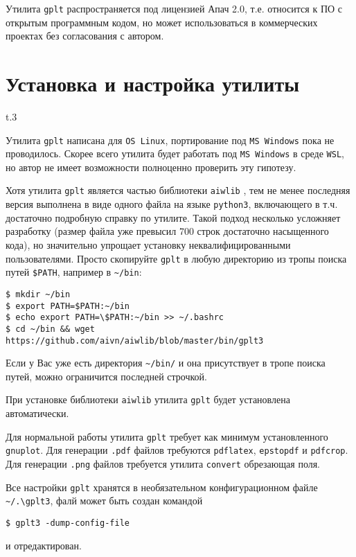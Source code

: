 \documentclass[12pt]{article}
\def\gplt{{\tt gplt}}
\def\gnuplot{{\tt gnuplot}}
\def\python{{\tt python3}}
\def\png{{\tt .png}}
\def\pdf{{\tt .pdf}}
\begin{document}
Утилита \gplt{} распространяется под лицензией Апач 2.0, т.е. относится к ПО с открытым программным кодом, но может использоваться в коммерческих проектах
без согласования с автором.

\section{Установка  и настройка утилиты}
\begin{wrapfigure}{t}{.3\textwidth}
  \vphantom{.}
  \vspace{-3cm}

\end{wrapfigure}
Утилита \gplt{} написана для \verb'OS Linux', портирование под \verb'MS Windows' пока не проводилось. Скорее всего утилита будет работать
под \verb'MS Windows' в среде \verb'WSL', но автор не имеет возможности полноценно проверить эту гипотезу.

Хотя утилита \gplt{} является частью библиотеки \verb'aiwlib' \cite{aiwlib:SR:PP2018,aiwlib:SV2018,aiwlib:git},
тем не менее последняя версия выполнена в виде одного файла на языке \python, включающего в т.ч. достаточно подробную справку по утилите.
Такой подход несколько усложняет разработку (размер файла уже превысил 700 строк достаточно насыщенного кода), но значительно упрощает установку
неквалифицированными пользователями. Просто скопируйте \gplt{} в любую директорию из тропы поиска путей \verb'$PATH', например в \verb'~/bin':
\begin{verbatim}
$ mkdir ~/bin
$ export PATH=$PATH:~/bin
$ echo export PATH=\$PATH:~/bin >> ~/.bashrc
$ cd ~/bin && wget https://github.com/aivn/aiwlib/blob/master/bin/gplt3 
\end{verbatim}
Если у Вас уже есть директория \verb'~/bin/' и она присутствует в тропе поиска путей, можно ограничится последней строчкой.

При установке библиотеки \verb'aiwlib' утилита \gplt{} будет установлена автоматически.

Для нормальной работы утилита \gplt{} требует как минимум установленного \gnuplot. Для генерации \pdf{} файлов требуются \verb'pdflatex', \verb'epstopdf'
и \verb'pdfcrop'. Для генерации \png{} файлов требуется утилита \verb'convert' обрезающая поля.

Все настройки \gplt{} хранятся в необязательном конфигурационном файле  \verb'~/.\gplt3',
фалй может быть создан командой
\begin{verbatim}
$ gplt3 -dump-config-file
\end{verbatim}
и отредактирован.\\
\end{document}

